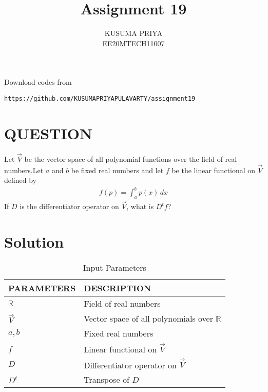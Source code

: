 \documentclass[journal,12pt,twocolumn]{IEEEtran}
\begin{document}
\renewcommand{\thefigure}{\theproblem}

\def\putbox#1#2#3{\makebox[0in][l]{\makebox[#1][l]{}\raisebox{\baselineskip}[0in][0in]{\raisebox{#2}[0in][0in]{#3}}}}
     \def\rightbox#1{\makebox[0in][r]{#1}}
     \def\centbox#1{\makebox[0in]{#1}}
     \def\topbox#1{\raisebox{-\baselineskip}[0in][0in]{#1}}
     \def\midbox#1{\raisebox{-0.5\baselineskip}[0in][0in]{#1}}
\vspace{3cm}
\title{Assignment 19}
\author{KUSUMA PRIYA\\EE20MTECH11007}

\maketitle
\newpage

\bigskip
\renewcommand{\thefigure}{\theenumi}
\renewcommand{\thetable}{\theenumi}
Download codes from 
%
\begin{lstlisting}
https://github.com/KUSUMAPRIYAPULAVARTY/assignment19
\end{lstlisting}
%
 
\section{QUESTION}
Let $\vec{V}$ be the vector space of all polynomial functions over the field of real numbers.Let $a$ and $b$ be fixed real numbers and let $f$ be the linear functional on $\vec{V}$ defined by 
\begin{align}
    f(p)=\int_a ^b p(x) \,dx
\end{align}
If $D$ is the differentiator operator on $\vec{V}$, what is $D^tf$?
%

\section{Solution}
\begin{table}[!h]
\centering
\begin{tabular}{|p{3cm}|p{5cm}|}
\hline
\textbf{PARAMETERS}&\textbf{DESCRIPTION}\\
\hline
$\mathbb{R}$&Field of real numbers\\
\hline
$\vec{V}$&Vector space of all polynomials over $\mathbb{R}$\\
\hline
$a,b$ & Fixed real numbers\\
\hline
$f$ &Linear functional on $\vec{V}$\\
\hline
$D$ & Differentiator operator on $\vec{V}$\\
\hline
$D^t$ &Transpose of $D$\\
\hline
\end{tabular}
\caption{Input Parameters}
\end{table}
\end{document}

